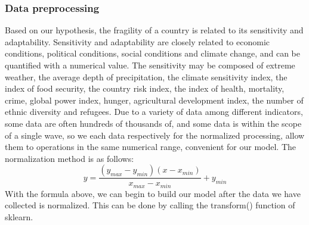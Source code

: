 \documentclass{mcmthesis}
\begin{document}
\newpage
\subsubsection{Data preprocessing}
Based on our hypothesis, the fragility of a country is related to its 
sensitivity and adaptability. Sensitivity and adaptability are closely 
related to economic conditions, political conditions, social conditions and 
climate change, and can be quantified with a numerical value. The sensitivity 
may be composed of extreme weather, the average depth of precipitation, the 
climate sensitivity index, the index of food security, the country risk index, 
the index of health, mortality, crime, global power index, hunger, agricultural 
development index, the number of ethnic diversity and refugees. Due to a variety 
of data among different indicators, some data are often hundreds of thousands of, 
and some data is within the scope of a single wave, so we each data respectively 
for the normalized processing, allow them to operations in the same numerical range, 
convenient for our model. The normalization method is as follows:
\[ y=\frac{\left ( y_{max}-y_{min} \right )\left ( x-x_{min} \right )}{x_{max}-x_{min}}+y_{min} \]
With the formula above, we can begin to build our model after the data we have 
collected is normalized. This can be done by calling the transform() function 
of sklearn. 
\end{document}
